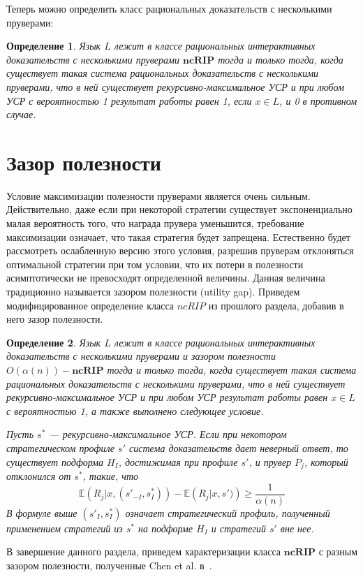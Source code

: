 \documentclass[14pt, a4paper]{extreport}
\newtheorem{definition}{\indent Определение}
\begin{document}
        Теперь можно определить класс рациональных доказательств с несколькими пруверами:

        \begin{definition}
            Язык $L$ лежит в классе рациональных интерактивных доказательств с несколькими пруверами $\textbf{ncRIP}$ тогда и только тогда, когда существует такая система рациональных доказательств с несколькими пруверами, что в ней существует рекурсивно-максимальное УСР и при любом УСР с вероятностью 1 результат работы равен 1, если $x \in L$, и 0 в противном случае.
        \end{definition}

        \section{Зазор полезности}
        Условие максимизации полезности пруверами является очень сильным. Действительно, даже если при некоторой стратегии существует экспоненциально малая вероятность того, что награда прувера уменьшится, требование максимизации означает, что такая стратегия будет запрещена. Естественно будет рассмотреть ослабленную версию этого условия, разрешив пруверам отклоняться оптимальной стратегии при том условии, что их потери в полезности асимптотически не превосходят определенной величины. Данная величина традиционно называется зазором полезности (utility gap). Приведем модифицированное определение класса $ncRIP$ из прошлого раздела, добавив в него зазор полезности.

\begin{definition}
    Язык $L$ лежит в классе рациональных интерактивных доказательств с несколькими пруверами и зазором полезности $O(\alpha(n))-\textbf{ncRIP}$ тогда и только тогда, когда существует такая система рациональных доказательств с несколькими пруверами, что в ней существует рекурсивно-максимальное УСР и при любом УСР результат работы равен $x \in L$ с вероятностью 1, а также выполнено следующее условие.

    Пусть $s^*$ --- рекурсивно-максимальное УСР. Если при некотором стратегическом профиле $s'$ система доказательств дает неверный ответ, то существует подформа $H_I$, достижимая при профиле $s'$, и прувер $P_j$, который отклонился от $s^*$, такие, что
    \[\mathbb{E}\left(R_j|x, (s'_{-I}, s^*_I)\right) - \mathbb{E}\left(R_j|x, s')\right) \geqslant \frac{1}{\alpha(n)}\]
    В формуле выше $(s'_I, s^*_I)$ означает стратегический профиль, полученный применением стратегий из $s^*$ на подформе $H_I$ и стратегий $s'$ вне нее.
\end{definition}
        В завершение данного раздела, приведем характеризации класса $\textbf{ncRIP}$ с разным зазором полезности, полученные Chen et al. в~\cite{chen2017noncoop}.
\end{document}
